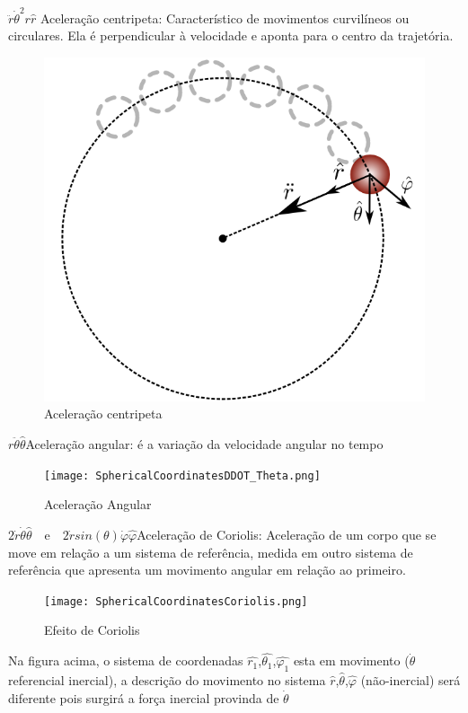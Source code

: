 \documentclass[a4paper,12pt, aps, rmp,twocolumn]{article}
\begin{document}
	$\ddot{r} \dot{\theta}^2 r \hat{r} $ \indent Aceleração centripeta: Característico de movimentos curvilíneos ou circulares. Ela é perpendicular à velocidade e aponta para o centro da trajetória. 
	\begin{figure}[h]
		\begin{center}
			\includegraphics[scale=0.2]{SphericalCoordinatesDDOT_R.png} 
			\caption{Aceleração centripeta}
		\end{center}
	\end{figure}

	$ r \ddot{\theta} \hat{\theta} $\indent Aceleração angular: é a variação da velocidade angular no tempo
	\begin{figure}[h]
		\begin{center}
			\texttt{[image: SphericalCoordinatesDDOT\_Theta.png]} 
			\caption{Aceleração Angular}
		\end{center}
	\end{figure}

	$ 2\dot{r} \dot{\theta} \hat{\theta} \quad \text{e} \quad 2\dot{r}sin(\theta)\dot{\varphi}\hat{\varphi}$\indent Aceleração de Coriolis: Aceleração de um corpo que se move em relação a um sistema de referência, medida em outro sistema de referência que apresenta um movimento angular em relação ao primeiro.
\begin{figure}[h]
		\begin{center}
			\texttt{[image: SphericalCoordinatesCoriolis.png]} 
			\caption{Efeito de Coriolis}
		\end{center}
	\end{figure}
	
	Na figura acima, o sistema de coordenadas $\hat{r_1}$,$\hat{\theta_1}$,$\hat{\varphi_1}$ esta em  movimento ($\dot\theta$ referencial inercial), a descrição do movimento no sistema $\hat{r}$,$\hat{\theta}$,$\hat{\varphi}$ (não-inercial) será diferente pois surgirá a força inercial provinda de $\dot\theta$
	
\end{document}
